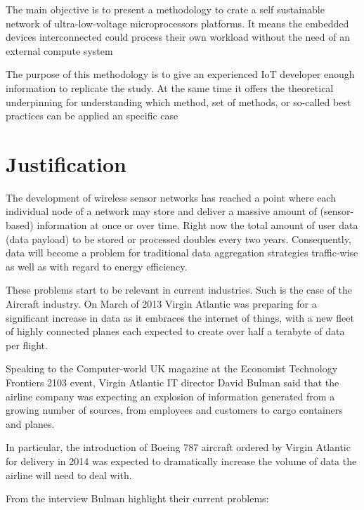 The main objective is to present a methodology to crate a self sustainable
network of ultra-low-voltage microprocessors platforms. It means the embedded 
devices interconnected could process their own workload without the need of an 
external compute system

The purpose of this methodology is to give an experienced IoT  developer 
enough information to replicate the study. At the same time it offers the theoretical 
underpinning for understanding which method, set of methods, or so-called best 
practices can be applied an specific case


\section{Justification}
\noindent

The development of wireless sensor networks has reached a point where each 
individual node of a network may store and deliver a massive amount of 
(sensor-based) information at once or over time. Right now the total amount of 
user data (data payload) to be stored or processed doubles every two years. Consequently,
data will become a problem for traditional data aggregation strategies 
traffic-wise as well as with regard to energy efficiency. 

These problems start to be relevant in current industries. Such is the case of 
the Aircraft industry. On March of 2013 Virgin Atlantic was preparing for a 
significant increase in data as it embraces the internet of things, with a new fleet of highly 
connected planes each expected to create over half a terabyte of data per flight.

Speaking to the Computer-world UK magazine at the Economist Technology Frontiers 2103 event, Virgin 
Atlantic IT director David Bulman said that the airline company was expecting an 
explosion of information generated from a growing number of sources, from 
employees and customers to cargo containers and planes.

In particular, the introduction of Boeing 787 aircraft ordered by Virgin 
Atlantic for delivery in 2014  was expected to dramatically increase the volume 
of data the airline will need to deal with.

From the interview Bulman highlight their current problems: 


